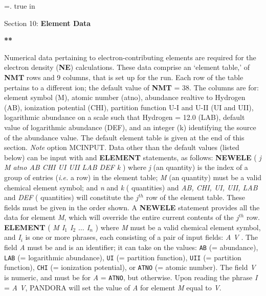 %
\newtoks\footline \footline={\hss{}.\folio\hss}
\top
{} true in
\centerline{Section 10: {\bf Element Data}}
\blankline
\blankline
\centerline{\bf ***}
\blankline
\blankline
Numerical data pertaining to electron-contributing elements are required
for the electron density ({\bf NE}) calculations. These data comprise an
`element table,' of {\bf NMT} rows and 9 columns, that is set up for the
run. Each row of the table pertains to a different ion; the default
value of {\bf NMT} = 38. The columns are for: element symbol (M), atomic
number (atno), abundance realtive to Hydrogen (AB), ionization potential
(CHI), partition function U-I and U-II (UI and UII), logarithmic abundance
on a scale such that Hydrogen = 12.0 (LAB), default value of logarithmic
abundance (DEF), and an integer (k) identifying the source of the
abundance value. The default element table is given at the end of this
section. {\it Note} option MCINPUT.
\blankline
Data other than the default values (listed below) can be input with 
 and {\bf ELEMENT} statements, as follows:
\blankline \noindent
{\bf NEWELE} ( {\it j M atno AB CHI UI UII LAB DEF k} ) 
\space \noindent
where {\it j} (an {\intg} quantity) is the index of a group of entries
({\it i.e.} a row) in the element table; {\it M} (an {\alfa}
quantity) must be a valid chemical element symbol; and {\it n} and {\it k}
({\intg} quantities) and {\it AB, CHI, UI, UII, LAB} and {\it DEF} 
({\flpt} quantities) will constitute the $j^{th}$ row of the element table. 
These fields must be given in the order shown.
A {\bf NEWELE} statement provides all the data for element {\it M}, 
which will override the entire current contents of the $j^{th}$ row.
\blankline \noindent
{\bf ELEMENT} ( {\it M I$_1$ I$_2$ $\ldots$ I$_n$ } ) 
\space \noindent
where {\it M} must be a valid chemical element symbol, and {\it I}$_i$
is one or more phrases, each consisting of a pair of input fields:
{\it A V }. The field {\it A} must be {\alfa} and is an identifier; it can take
on the values: {\tt AB} (= abundance), {\tt LAB} (= logarithmic
abundance), {\tt UI} (= partition function), {\tt UII} (= partition function),
{\tt CHI} (= ionization potential), or {\tt ATNO} (= atomic number).
The field {\it V} is numeric, and must be {\intg} for {\it A} = {\tt ATNO},
but {\flpt} otherwise. Upon reading the phrase {\it I} = {\it A V},
PANDORA will set the value of {\it A} for element {\it M} equal to {\it V}.

